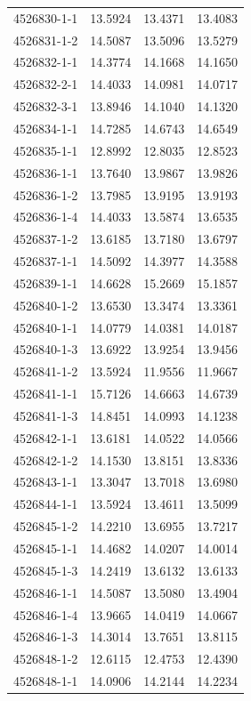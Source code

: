 \begin{longtable}{lrrr}
4526830-1-1 & 13.5924 & 13.4371 & 13.4083 \\
4526831-1-2 & 14.5087 & 13.5096 & 13.5279 \\
4526832-1-1 & 14.3774 & 14.1668 & 14.1650 \\
4526832-2-1 & 14.4033 & 14.0981 & 14.0717 \\
4526832-3-1 & 13.8946 & 14.1040 & 14.1320 \\
4526834-1-1 & 14.7285 & 14.6743 & 14.6549 \\
4526835-1-1 & 12.8992 & 12.8035 & 12.8523 \\
4526836-1-1 & 13.7640 & 13.9867 & 13.9826 \\
4526836-1-2 & 13.7985 & 13.9195 & 13.9193 \\
4526836-1-4 & 14.4033 & 13.5874 & 13.6535 \\
4526837-1-2 & 13.6185 & 13.7180 & 13.6797 \\
4526837-1-1 & 14.5092 & 14.3977 & 14.3588 \\
4526839-1-1 & 14.6628 & 15.2669 & 15.1857 \\
4526840-1-2 & 13.6530 & 13.3474 & 13.3361 \\
4526840-1-1 & 14.0779 & 14.0381 & 14.0187 \\
4526840-1-3 & 13.6922 & 13.9254 & 13.9456 \\
4526841-1-2 & 13.5924 & 11.9556 & 11.9667 \\
4526841-1-1 & 15.7126 & 14.6663 & 14.6739 \\
4526841-1-3 & 14.8451 & 14.0993 & 14.1238 \\
4526842-1-1 & 13.6181 & 14.0522 & 14.0566 \\
4526842-1-2 & 14.1530 & 13.8151 & 13.8336 \\
4526843-1-1 & 13.3047 & 13.7018 & 13.6980 \\
4526844-1-1 & 13.5924 & 13.4611 & 13.5099 \\
4526845-1-2 & 14.2210 & 13.6955 & 13.7217 \\
4526845-1-1 & 14.4682 & 14.0207 & 14.0014 \\
4526845-1-3 & 14.2419 & 13.6132 & 13.6133 \\
4526846-1-1 & 14.5087 & 13.5080 & 13.4904 \\
4526846-1-4 & 13.9665 & 14.0419 & 14.0667 \\
4526846-1-3 & 14.3014 & 13.7651 & 13.8115 \\
4526848-1-2 & 12.6115 & 12.4753 & 12.4390 \\
4526848-1-1 & 14.0906 & 14.2144 & 14.2234 \\

\end{longtable}
